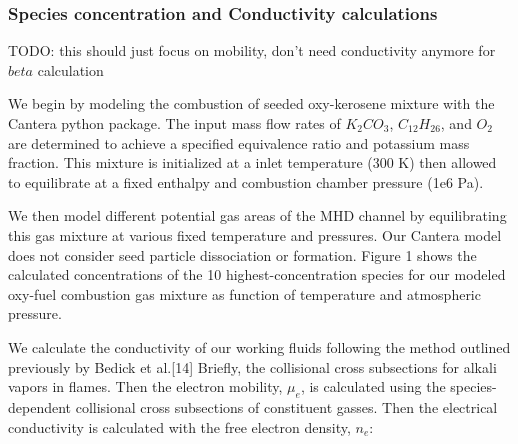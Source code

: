 
\hypertarget{species-concentration-and-conductivity-calculations}{%
\subsubsection{Species concentration and Conductivity calculations}\label{species-concentration-and-conductivity-calculations}}

TODO: this should just focus on mobility, don't need conductivity anymore for $beta$ calculation

We begin by modeling the combustion of seeded oxy-kerosene mixture with the Cantera python package. The input mass flow rates of $K_2CO_3$, $C_{12}H_{26}$, and $O_2$ are determined to achieve a specified equivalence ratio and potassium mass fraction. This mixture is initialized at a inlet temperature (300 K) then allowed to equilibrate at a fixed enthalpy and combustion chamber pressure (1e6 Pa).

We then model different potential gas areas of the MHD channel by equilibrating this gas mixture at various fixed temperature and pressures. Our Cantera model does not consider seed particle dissociation or formation. Figure 1 shows the calculated concentrations of the 10 highest-concentration species for our modeled oxy-fuel combustion gas mixture as function of temperature and atmospheric pressure.

We calculate the conductivity of our working fluids following the method outlined previously by Bedick et al.{[}14{]} Briefly, the collisional cross subsections for alkali vapors in flames. Then the electron mobility, \(\mu_{e}\), is calculated using the species-dependent collisional cross subsections of constituent gasses. Then the electrical conductivity is calculated with the free electron density, \(n_{e}\):

